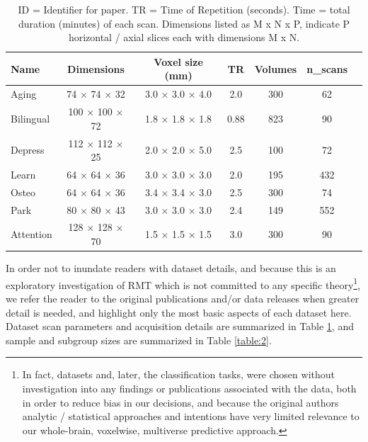 \documentclass[12pt]{spieman}  %
\begin{document}
\begin{spacing}{2}
\begin{table}[h!]
\caption{
    ID = Identifier for paper. TR = Time of Repetition (seconds).
    Time = total duration (minutes) of each scan. Dimensions listed as M x N x P,
    indicate P horizontal / axial slices each with dimensions M x N.
}
\label{table:1}
\small
\centering
\begin{tabular}{ l c c c c c c }
\hline
\textbf{Name}    & \textbf{Dimensions}  & \textbf{Voxel size (mm)} & \textbf{TR} & \textbf{Volumes} & \textbf{n\_scans} \\
\hline
Aging     & 74 × 74 × 32   & 3.0 × 3.0 × 4.0 & 2.0  & 300 & 62  \\
Bilingual    & 100 × 100 × 72 & 1.8 × 1.8 × 1.8 & 0.88 & 823 & 90  \\
Depress   & 112 × 112 × 25 & 2.0 × 2.0 × 5.0 & 2.5  & 100 & 72  \\
Learn     & 64 × 64 × 36   & 3.0 × 3.0 × 3.0 & 2.0  & 195 & 432 \\
Osteo     & 64 × 64 × 36   & 3.4 × 3.4 × 3.0 & 2.5  & 300 & 74  \\
Park      & 80 × 80 × 43   & 3.0 × 3.0 × 3.0 & 2.4  & 149 & 552 \\
Attention & 128 × 128 × 70 & 1.5 × 1.5 × 1.5 & 3.0  & 300 & 90  \\
\hline
\end{tabular}
\end{table}

In order not to inundate readers with dataset details, and because this is an
exploratory investigation of RMT which is not committed to any specific
theory\footnote{In fact, datasets and, later, the classification tasks, were
chosen without investigation into any findings or publications associated with
the data, both in order to reduce bias in our decisions, and because the
original authors analytic / statistical approaches and intentions have very
limited relevance to our whole-brain, voxelwise, multiverse predictive
approach.}, we refer the reader to the original publications and/or data
releases when greater detail is needed, and highlight only the most basic
aspects of each dataset here.  Dataset scan parameters and acquisition details
are summarized in Table \ref{table:1}, and sample and subgroup sizes are
summarized in Table \ref{table:2}.


\end{spacing}
\end{document}
